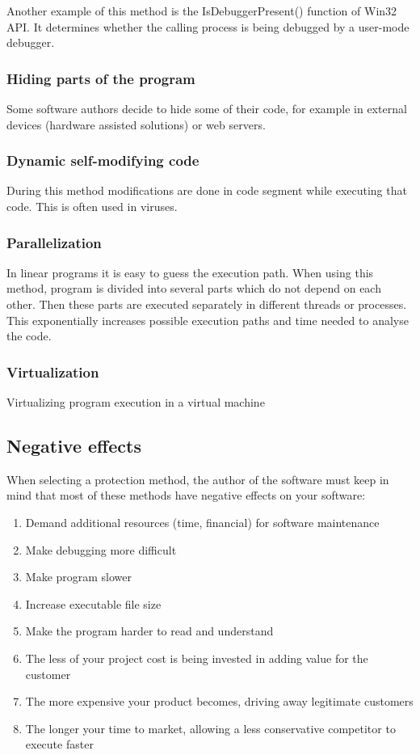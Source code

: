 \documentclass[a4paper,12pt]{article}
\begin{document}
Another example of this method is the IsDebuggerPresent() function of Win32
API. It determines whether the calling process is being debugged by a
user-mode debugger.

\subsubsection{Hiding parts of the program}
Some software authors decide to hide some of their code, for example in
external devices (hardware assisted solutions) or web servers.

\subsubsection{Dynamic self-modifying code}
During this method modifications are done in code segment while executing
that code. This is often used in viruses.

\subsubsection{Parallelization}
In linear programs it is easy to guess the execution path. When using this
method, program is divided into several parts which do not depend on each
other. Then these parts are executed separately in different threads or
processes. This exponentially increases possible execution paths and time
needed to analyse the code.

\subsubsection{Virtualization}
Virtualizing program execution in a virtual machine

\subsection{Negative effects}
When selecting a protection method, the author of the software must keep
in mind that most of these methods have negative effects on your software:
\begin{enumerate}
\item Demand additional resources (time, financial) for software maintenance
\item Make debugging more difficult
\item Make program slower
\item Increase executable file size
\item Make the program harder to read and understand
\item The less of your project cost is being invested in adding value for the
    customer
\item The more expensive your product becomes, driving away legitimate
    customers
\item The longer your time to market, allowing a less conservative competitor
    to execute faster
\end{enumerate}
\end{document}
